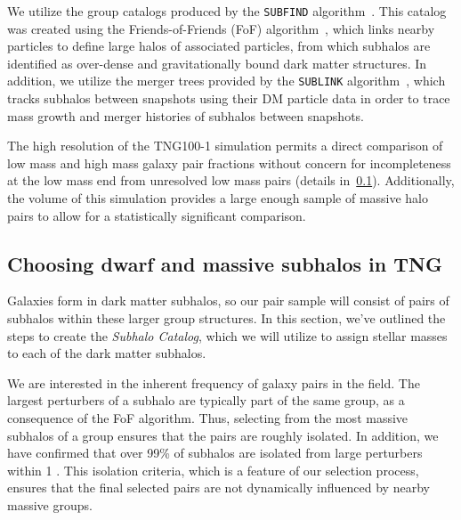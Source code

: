 \documentclass[twocolumn]{aastex631}
\newcommand{\subcat}{\textit{Subhalo Catalog}}
\begin{document}
    We utilize the group catalogs produced by the \texttt{SUBFIND} algorithm~\citep{springel2001,dolag09}. 
    This catalog was created using the Friends-of-Friends (FoF) algorithm~\citep{davis1985}, which links nearby particles to define large halos of associated particles, from which subhalos are identified as over-dense and gravitationally bound dark matter structures.
    In addition, we utilize the merger trees provided by the \texttt{SUBLINK} algorithm~\citep{rg15}, which tracks subhalos between snapshots using their DM particle data in order to trace mass growth and merger histories of subhalos between snapshots.
    
    The high resolution of the TNG100-1 simulation permits a direct comparison of low mass and high mass galaxy pair fractions without concern for incompleteness at the low mass end from unresolved low mass pairs (details in~\ref{sec:methods-halos}).
    Additionally, the volume of this simulation provides a large enough sample of massive halo pairs to allow for a statistically significant comparison. 


    \subsection{Choosing dwarf and massive subhalos in TNG} \label{sec:methods-halos}
    Galaxies form in dark matter subhalos, so our pair sample will consist of pairs of subhalos within these larger group structures.
    In this section, we've outlined the steps to create the \subcat, which we will utilize to assign stellar masses to each of the dark matter subhalos. 
 
    We are interested in the inherent frequency of galaxy pairs in the field. 
    The largest perturbers of a subhalo are typically part of the same group, as a consequence of the FoF algorithm. 
    Thus, selecting from the most massive subhalos of a group ensures that the pairs are roughly isolated. 
    In addition, we have confirmed that over 99\% of subhalos are isolated from large perturbers within 1 \Mpc.
    This isolation criteria, which is a feature of our selection process, ensures that the final selected pairs are not dynamically influenced by nearby massive groups. 
\end{document}
